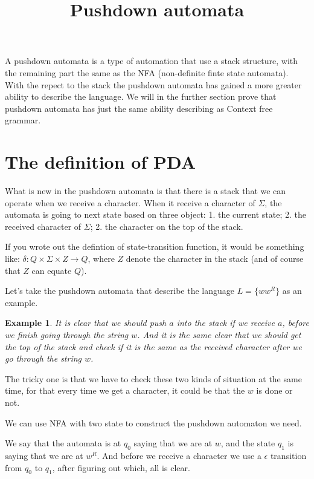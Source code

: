\documentclass[12pt]{article}
\theoremstyle{definition}
\newtheorem{exam}[definition]{Example}
\theoremstyle{remark}
\begin{document}
\title{Pushdown automata}   
\maketitle 
A pushdown automata is a type of automation that use a stack structure, with the remaining part the same as the NFA (non-definite finte state automata). With the repect to the stack the pushdown automata has gained a more greater ability to describe the language. We will in the further section prove that pushdown automata has just the same ability describing as Context free grammar. 

\section{The definition of PDA}
\label{sec:The definition of PDA}

What is new in the pushdown automata is that there is a stack that we can operate when we receive a character. 
When it receive a character of \( \Sigma\), the automata is going to next state based on three object: 1. the current state; 2. the received character of \( \Sigma\); 2. the character on the top of the stack. 

If you wrote out the defintion of state-transition function, it would be something like: \(\delta \colon Q \times \Sigma \times Z \to Q\), where \(Z\) denote the character in the stack (and of course that \(Z\) can equate \(Q\)). 

Let's take the pushdown automata that describe the language \(L = \{ w w ^{R} \}\) as an example. 

\begin{exam}
	{\sl
It is clear that we should push \(a\) into the stack if we receive \(a\), before we finish going through the string \(w\). And it is the same clear that we should get the top of the stack and check if it is the same as the received character after we go through the string \(w\).

The tricky one is that we have to check these two kinds of situation at the same time, for that every time we get a character, it could be that the \(w\) is done or not.

We can use NFA with two state to construct the pushdown automaton we need.

We say that the automata is at \(q_{0}\) saying that we are at \(w\), and the state \(q_1\) is saying that we are at \(w ^{R}\). And before we receive a character we use a \(\epsilon\) transition from \(q_{0}\) to \(q_1\),
after figuring out which, all is clear.
}
\begin{figure}
	\centering
{}
\end{figure}
\end{exam}
\end{document}
